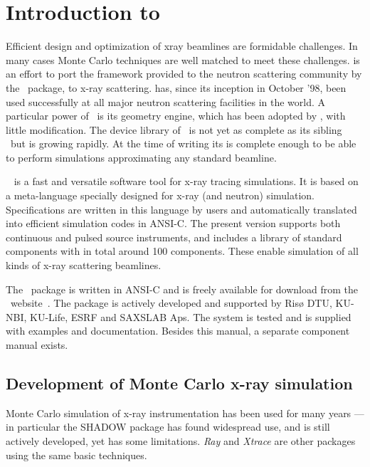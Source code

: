 
\chapter{Introduction to \MCX}

Efficient design and optimization of xray beamlines are
formidable challenges. In many cases Monte Carlo techniques are well matched to meet
these challenges. 
\MCX is an effort to port the framework provided to the neutron scattering community by the \MCS\ package, to x-ray scattering. \MCS has, since its inception in October '98, been used successfully at all major neutron scattering facilities in the world. A particular power of \MCS\ is its geometry engine, which has been adopted by \MCX, with little modification. The device library of \MCX\ is not yet as complete as its sibling \MCS\ but is growing rapidly.
At the time of writing its is complete enough to be able to perform simulations approximating any standard beamline.

\MCX\ %
is a fast and versatile software tool for x-ray tracing simulations.
It is based on a meta-language specially designed for x-ray (and neutron)
simulation. Specifications are written in this language by users and
automatically translated into efficient simulation codes in ANSI-C.
The present version supports both continuous and pulsed source instruments, and includes a library of standard
components with in total around 100 components. These enable simulation of all kinds of x-ray scattering beamlines.

The \MCX\ package is written in ANSI-C and is freely available for download
from the \MCX\ website~\cite{mcxtrace_webpage}. The package is actively
developed and supported by  Risø DTU, KU-NBI, KU-Life, ESRF and SAXSLAB Aps.
The system is tested and is supplied with examples and documentation.
Besides this manual, a separate component manual exists.


\section{Development of Monte Carlo x-ray simulation}
Monte Carlo simulation of x-ray instrumentation has been used for many years --- in particular the SHADOW package 
\cite{welnak1994shadow,sanchez2011shadow3}
has found widespread use, and is still actively developed, yet has some
limitations. \emph{Ray}\cite{schaefers2008bessy} and \emph{Xtrace}\cite{bauer2007simulation} are other packages using the same
basic techniques. 

